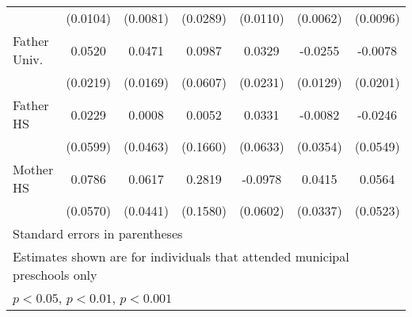 \begin{table}[htbp]
\begin{tabular}{l*{6}{c}}
            &    (0.0104)         &    (0.0081)         &    (0.0289)         &    (0.0110)         &    (0.0062)         &    (0.0096)         \\
\addlinespace
Father Univ.&      0.0520\sym{*}  &      0.0471\sym{**} &      0.0987         &      0.0329         &     -0.0255\sym{*}  &     -0.0078         \\
            &    (0.0219)         &    (0.0169)         &    (0.0607)         &    (0.0231)         &    (0.0129)         &    (0.0201)         \\
\addlinespace
Father HS   &      0.0229         &      0.0008         &      0.0052         &      0.0331         &     -0.0082         &     -0.0246         \\
            &    (0.0599)         &    (0.0463)         &    (0.1660)         &    (0.0633)         &    (0.0354)         &    (0.0549)         \\
\addlinespace
Mother HS   &      0.0786         &      0.0617         &      0.2819         &     -0.0978         &      0.0415         &      0.0564         \\
            &    (0.0570)         &    (0.0441)         &    (0.1580)         &    (0.0602)         &    (0.0337)         &    (0.0523)         \\
\bottomrule
\multicolumn{7}{l}{\footnotesize Standard errors in parentheses}\\
\multicolumn{7}{l}{\footnotesize Estimates shown are for individuals that attended municipal preschools only}\\
\multicolumn{7}{l}{\footnotesize \sym{*} \(p<0.05\), \sym{**} \(p<0.01\), \sym{***} \(p<0.001\)}\\
\end{tabular}
\end{table}
